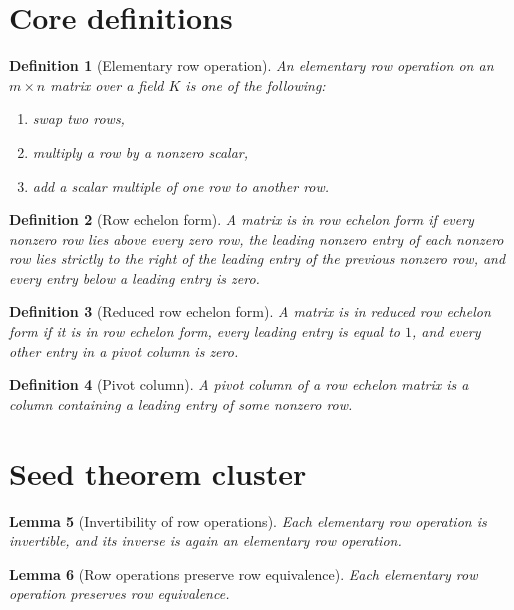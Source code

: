 \documentclass[11pt]{article}
\newtheorem{definition}{Definition}[section]
\newtheorem{lemma}[definition]{Lemma}
\begin{document}
\section{Core definitions}

\begin{definition}[Elementary row operation]\label{def:elementary-row-operation}
An elementary row operation on an $m \times n$ matrix over a field $K$ is one
of the following:
\begin{enumerate}
\item swap two rows,
\item multiply a row by a nonzero scalar,
\item add a scalar multiple of one row to another row.
\end{enumerate}
\end{definition}

\begin{definition}[Row echelon form]\label{def:row-echelon-form}
A matrix is in row echelon form if every nonzero row lies above every zero row,
the leading nonzero entry of each nonzero row lies strictly to the right of the
leading entry of the previous nonzero row, and every entry below a leading
entry is zero.
\end{definition}

\begin{definition}[Reduced row echelon form]\label{def:reduced-row-echelon-form}
A matrix is in reduced row echelon form if it is in row echelon form, every
leading entry is equal to $1$, and every other entry in a pivot column is zero.
\end{definition}

\begin{definition}[Pivot column]\label{def:pivot-column}
A pivot column of a row echelon matrix is a column containing a leading entry
of some nonzero row.
\end{definition}

\section{Seed theorem cluster}

\begin{lemma}[Invertibility of row operations]\label{lem:row-ops-are-invertible}
Each elementary row operation is invertible, and its inverse is again an
elementary row operation.
\end{lemma}

\begin{lemma}[Row operations preserve row equivalence]
\label{lem:row-ops-preserve-row-equivalence}
Each elementary row operation preserves row equivalence.
\end{lemma}
\end{document}
